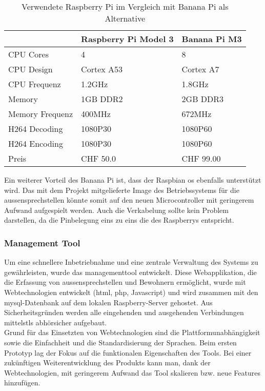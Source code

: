 \begin{table}[]     
	\centering
	\label{microcontrollerComparison}
	\begin{tabular}{l|ll}
		\multicolumn{1}{r|}{} & Raspberry Pi Model 3 & Banana Pi M3 \\ \hline
		CPU Cores             & 4                    & 8            \\ \hline
		CPU Design            & Cortex A53           & Cortex A7    \\ \hline
		CPU Frequenz          & 1.2GHz               & 1.8GHz       \\ \hline
		Memory                & 1GB DDR2             & 2GB DDR3     \\ \hline
		Memory Frequenz       & 400MHz               & 672MHz       \\ \hline
		H264 Decoding         & 1080P30              & 1080P60      \\ \hline
		H264 Encoding         & 1080P30              & 1080P60      \\ \hline
		Preis				  & CHF 50.0             & CHF 99.00    \\ \hline
	\end{tabular}
	\caption{Verwendete Raspberry Pi im Vergleich mit Banana Pi  als Alternative}
	\label{tbl:microcontrollerComparison}
\end{table}
Ein weiterer Vorteil des Banana Pi ist, dass der Raspbian \gls{os} ebenfalls unterstützt wird. Das mit dem Projekt mitgelieferte Image des Betriebssystems für die \gls{aussensprechstelle}n könnte somit auf den neuen Microcontroller mit geringerem Aufwand aufgespielt werden. Auch die Verkabelung sollte  kein Problem darstellen, da die Pinbelegung eins zu eins die des Raspberrys entspricht.
\\
\subsubsection{Management Tool}
\label{kap:managementtool}
Um eine schnellere Inbetriebnahme und eine zentrale Verwaltung des Systems zu gewährleisten, wurde das \gls{managementtool} entwickelt. Diese Webapplikation, die die Erfassung von \gls{aussensprechstelle}n und Bewohnern ermöglicht, wurde mit Webtechnologien entwickelt (\gls{html}, \gls{php}, Javascript) und wird zusammen mit den \gls{mysql}-Datenbank auf dem lokalen Raspberry-Server gehostet. Aus Sicherheitsgründen werden alle eingehenden und ausgehenden Verbindungen mittels\gls{tls} abhörsicher aufgebaut.
\\
Grund für das Einsetzten von Webtechnologien sind die Plattformunabhängigkeit sowie die Einfachheit und die Standardisierung der Sprachen. Beim ersten Prototyp lag der Fokus auf die funktionalen Eigenschaften des Tools. Bei einer zukünftigen Weiterentwicklung des Produkts kann man, dank der Webtechnologien, mit geringerem Aufwand das Tool skalieren bzw. neue Features hinzufügen.
\\

